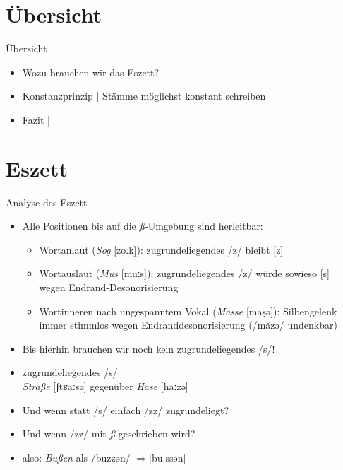 \section{Übersicht}

\begin{frame}
  {Übersicht}
  \onslide<+->
  \begin{itemize}[<+->]
    \item Wozu brauchen wir das \alert{Eszett}?
      \Zeile
    \item \alert{Konstanzprinzip} | Stämme möglichst konstant schreiben
      \Zeile
    \item Fazit | 
  \end{itemize}
\end{frame}


\section{Eszett}

\newcommand{\phopro}{\ensuremath{\Rightarrow}}

\begin{frame}
  {Analyse des Eszett}
  \pause
  \begin{itemize}[<+->]
    \item \alert{Alle Positionen bis auf die \textit{ß}-Umgebung sind herleitbar:}
      \begin{itemize}[<+->]
        \item Wortanlaut (\textit{Sog} [zoːk]): zugrundeliegendes /z/ bleibt [z]
        \item Wortauslaut (\textit{Mus} [muːs]): zugrundeliegendes /z/ würde sowieso [s]\\
          wegen Endrand-Desonorisierung
        \item Wortinneren nach ungespanntem Vokal (\textit{Masse} [maṣə]): \alert{Silbengelenk}\\
          immer stimmlos wegen Endranddesonorisierung (/măzə/ undenkbar)
      \end{itemize}
      \Halbzeile
    \item \alert{Bis hierhin brauchen wir noch kein zugrundeliegendes /s/!}
      \Halbzeile
    \item zugrundeliegendes /s/ \\
      \textit{Straße} [ʃtʁaːsə] gegenüber \textit{Hase} [haːzə]
    \item \alert{Und wenn statt /s/ einfach /zz/ zugrundeliegt?}
    \item \alert{Und wenn /zz/ mit \textit{ß} geschrieben wird?}
    \item also: \textit{Bußen} als /buzzən/ \phopro [buːssən]
  \end{itemize}
\end{frame}

